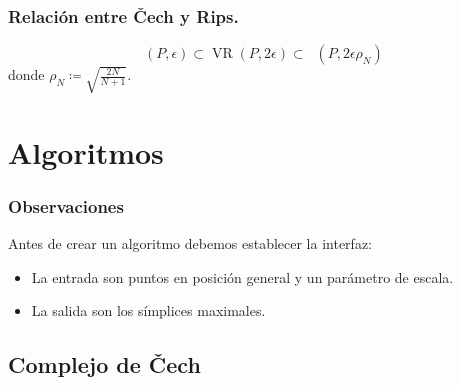 \documentclass{beamer}
\DeclareMathOperator{\VR}{VR}
\DeclareMathOperator{\Cech}{\check{C}}
\begin{document}
\begin{frame}\frametitle{Relación entre \v{C}ech y Rips.}
  \begin{Proposicion}
  \begin{displaymath}
    \Cech(P,\epsilon) \subset \VR(P,2\epsilon) \subset \Cech(P,2 \epsilon \rho_N)
  \end{displaymath}
  donde \(\rho_N \coloneqq \sqrt{\frac{2N}{N+1}}\).
  \end{Proposicion}
\end{frame}

\section{Algoritmos}

\begin{frame}\frametitle{Observaciones}
  Antes de crear un algoritmo debemos establecer la interfaz:
  \begin{itemize}
    \item La entrada son puntos en posición general y un parámetro de escala.
    \item La salida son los símplices maximales.
  \end{itemize}
\end{frame}

\subsection{Complejo de \v{C}ech}
\end{document}

